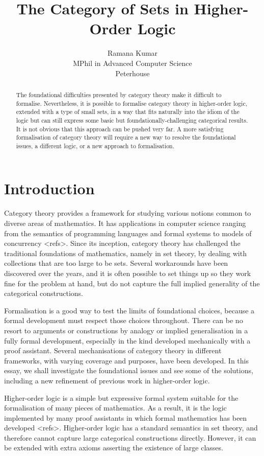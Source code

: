 \documentclass[twoside,titlepage,11pt]{article}
\title{The Category of Sets in Higher-Order Logic}
\author{Ramana Kumar\\MPhil in Advanced Computer Science\\Peterhouse}
\begin{document}
\maketitle
\begin{abstract}%
The foundational difficulties presented by category theory make it difficult to formalise.
Nevertheless, it is possible to formalise category theory in higher-order logic, extended with a type of small sets, in a way that fits naturally into the idiom of the logic but can still express some basic but foundationally-challenging categorical results.
It is not obvious that this approach can be pushed very far.
A more satisfying formalisation of category theory will require a new way to resolve the foundational issues, a different logic, or a new approach to formalisation.
\end{abstract}%
\section{Introduction}%
Category theory provides a framework for studying various notions common to diverse areas of mathematics.
It has applications in computer science ranging from the semantics of programming languages and formal systems to models of concurrency <refs>.
Since its inception, category theory has challenged the traditional foundations of mathematics, namely in set theory, by dealing with collections that are too large to be sets. 
Several workarounds have been discovered over the years, and it is often possible to set things up so they work fine for the problem at hand, but do not capture the full implied generality of the categorical constructions.

Formalisation is a good way to test the limits of foundational choices, because a formal development must respect those choices throughout.
There can be no resort to arguments or constructions by analogy or implied generalisation in a fully formal development, especially in the kind developed mechanically with a proof assistant.
Several mechanisations of category theory in different frameworks, with varying coverage and purposes, have been developed.
In this essay, we shall investigate the foundational issues and see some of the solutions, including a new refinement of previous work in higher-order logic.

Higher-order logic is a simple but expressive formal system suitable for the formalisation of many pieces of mathematics.
As a result, it is the logic implemented by many proof assistants in which formal mathematics has been developed <refs>.
Higher-order logic has a standard semantics in set theory, and therefore cannot capture large categorical constructions directly.
However, it can be extended with extra axioms asserting the existence of large classes.
\end{document}
